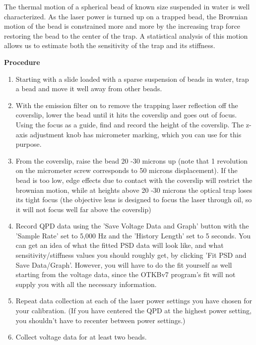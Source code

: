 \documentclass{../lab}
\begin{document}
The thermal motion of a spherical bead of known size suspended in water is well characterized. As the laser power is turned up on a trapped bead, the Brownian motion of the bead is constrained more and more by the increasing trap force restoring the bead to the center of the trap. A statistical analysis of this motion allows us to estimate both the sensitivity of the trap and its stiffness.

\textbf{Procedure}

\begin{enumerate}
    \item Starting with a slide loaded with a sparse suspension of beads in water, trap a bead and move it well away from other beads.

    \item With the emission filter on to remove the trapping laser reflection off the coverslip, lower the bead until it hits the coverslip and goes out of focus. Using the focus as a guide, find and record the height of the coverslip. The z-axis adjustment knob has micrometer marking, which you can use for this purpose.

    \item From the coverslip, raise the bead 20 -30  microns up (note that 1 revolution on the micrometer screw corresponds to 50 microns displacement). If the bead is too low, edge effects due to contact with the coverslip will restrict the brownian motion, while at heights above 20 -30 microns the optical trap loses its tight focus (the objective lens is designed to focus the laser through oil, so it will not focus well far above the coverslip)

    \item Record QPD data using the 'Save Voltage Data and Graph' button with the 'Sample Rate' set to 5,000 Hz and the 'History Length' set to 5 seconds. You can get an idea of what the fitted PSD data will look like, and what sensitivity/stiffness values you should roughly get, by clicking 'Fit PSD and Save Data/Graph'. However, you will have to do the fit yourself as well starting from the voltage data, since the OTKBv7 program's fit will not supply you with all the necessary information.

    \item Repeat data collection at each of the laser power settings you have chosen for your calibration. (If you have centered the QPD at the highest power setting, you shouldn't have to recenter between power settings.)

    \item Collect voltage data for at least two beads.

\end{enumerate}
\end{document}
